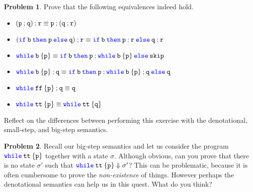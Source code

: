 \documentclass[a4paper, 11pt]{article}
\theoremstyle{definition}
\newtheorem{problem}{Problem}
\newcommand{\blue}[1]{\textcolor{blue}{#1}}
\begin{document}
\begin{problem}
        Prove that the following equivalences indeed hold.
        \begin{itemize}
                \item $\mathtt{(p \> \blue{ ;} \> q) \> \blue{ ;} \> r} \equiv
                        \mathtt{p \> \blue{ ;} \> (q \> \blue{ ;} \> r)}$
                \item $\mathtt{(\blue{if} \> b \> \blue{then} \> p \> \blue{else} \> q) 
                      \> \blue{ ;} \> \prog{r}} \equiv 
                      \mathtt{\blue{ if} \> b \> \blue{then} \> p \> \blue{ ;} \> r \> 
                      \blue {else} \> q \> \blue {;} \> r}$ 
              \item $\mathtt{\blue {while} \> b \> \{ p \} } \equiv
                        \mathtt{\blue{if} \> b \> \blue{then} \> p \> {\blue ;} \>
                        \mathtt{\blue{ while} \> b \> \{ p \} } 
                        \> \blue{ else} \> skip}$
                \item $\mathtt{\blue{ while} \> b \> \{ p \} } \> \blue{ ;} \> \mathtt{q} \equiv
                      \mathtt{\blue{if} \> b \> \blue{ then} \> p \> \blue{ ;}  \> \blue{ while} \> b \> \{ p \}
                      \> \blue{ ;} \> q
                      \> \blue{ else} \> q}$
                \item $\mathtt{\blue{ while} \> ff \> \{ p \} \> \blue{ ;} \> q } \equiv \mathtt{q}$
                \item $\mathtt{\blue{ while} \> tt \> \{ p \} } \equiv
                      \mathtt{\blue{ while} \> tt \> \{ q \} }$
        \end{itemize}
        Reflect on the differences between performing this exercise with the
        denotational, small-step, and big-step semantics.
\end{problem}

\begin{problem}
        Recall our big-step semantics and let us consider the program
        $\mathtt{\blue{ while} \> tt \> \{ p \} }$ together with a state
        $\sigma$. Although obvious, can you prove that there is no state
        $\sigma'$ such that $\mathtt{\blue{ while} \> tt \> \{ p \} }
        \Downarrow \sigma'$?  This can be problematic, because it is often
        cumbersome to prove the \emph{non-existence} of things. However perhaps the
        denotational semantics can help us in this quest.  What do you think?
\end{problem}
\end{document}
